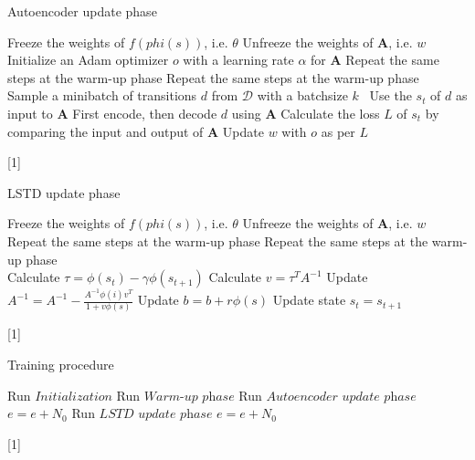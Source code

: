 \documentclass[a4paper,12pt,oneside]{article}
\numberwithin{equation}{section}
\begin{document}
    \clearpage
    \begin{algorithm}
    \caption{Autoencoder update phase}
        \begin{algorithmic}[1]
        \State Freeze the weights of \(f(phi(s))\), i.e. $\theta$
        \State Unfreeze the weights of $\mathbf{A}$, i.e. \(w\)
        \State Initialize an Adam optimizer \(o\) with a learning rate $\alpha$ for $\mathbf{A}$
            \State Repeat the same steps at the warm-up phase
                \State Repeat the same steps at the warm-up phase
                \\
                \State Sample a minibatch of transitions \(d\) from $\mathcal{D}$ with a batchsize \(k\) \
                \State Use the \(s_t\) of \(d\) as input to $\mathbf{A}$
                \State First encode, then decode \(d\) using $\mathbf{A}$
                \State Calculate the loss \(L\) of \(s_t\) by comparing the input and output of $\mathbf{A}$
                \State Update \(w\) with \(o\) as per \(L\)
            \EndFor
        \EndFor
        \end{algorithmic}[1]
    \end{algorithm}

    \clearpage
    \begin{algorithm}
    \caption{LSTD update phase}
        \begin{algorithmic}[1]
            \State Freeze the weights of \(f(phi(s))\), i.e. $\theta$
            \State Unfreeze the weights of $\mathbf{A}$, i.e. \(w\)
        \For {\(episode\) \(e = 1\) to \(N_0\)}
            \State Repeat the same steps at the warm-up phase
                \State Repeat the same steps at the warm-up phase
                \\
                \State Calculate $\tau = \phi(s_t) - \gamma \phi(s_{t+1})$
                \State Calculate $v = \tau^{T} A^{-1}$
                \State Update $A^{-1} = A^{-1} - \frac{A^{-1} \phi(i) v^{T}}{1 + v \phi(s)}$
                \State Update $b = b + r \phi(s)$
                \State Update state $s_t=s_{t+1}$
            \EndFor
        \EndFor
        \end{algorithmic}[1]    
    \end{algorithm}


    \clearpage
    \begin{algorithm}
        \caption{Training procedure}
        \begin{algorithmic}[1]
        \State Run \(Initialization\)
        \State Run \(\textit{Warm-up phase}\)
            \State Run \(\textit{Autoencoder update phase}\)
            \State $e=e+N_0$
            \State Run \(\textit{LSTD update phase}\)
            \State $e=e+N_0$
        \EndWhile
        \end{algorithmic}[1]    
    \end{algorithm}
    
    
\end{document}
